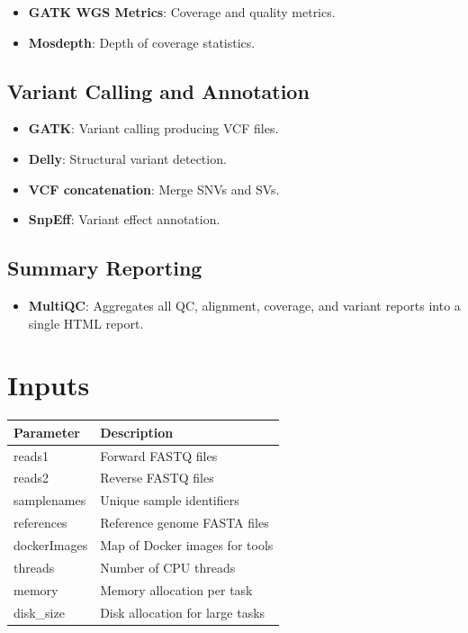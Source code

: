 \documentclass[13pt,letter]{article}
\begin{document}
\begin{itemize}
  \item \textbf{GATK WGS Metrics}: Coverage and quality metrics.
  \item \textbf{Mosdepth}: Depth of coverage statistics.
\end{itemize}

\subsection{Variant Calling and Annotation}

\begin{itemize}
  \item \textbf{GATK}: Variant calling producing VCF files.
  \item \textbf{Delly}: Structural variant detection.
  \item \textbf{VCF concatenation}: Merge SNVs and SVs.
  \item \textbf{SnpEff}: Variant effect annotation.
\end{itemize}

\subsection{Summary Reporting}

\begin{itemize}
  \item \textbf{MultiQC}: Aggregates all QC, alignment, coverage, and variant reports into a single HTML report.
\end{itemize}

\section{Inputs}

\begin{longtable}{ll}
\toprule
\textbf{Parameter} & \textbf{Description} \\
\midrule
reads1 & Forward FASTQ files \\
reads2 & Reverse FASTQ files \\
samplenames & Unique sample identifiers \\
references & Reference genome FASTA files \\
dockerImages & Map of Docker images for tools \\
threads & Number of CPU threads \\
memory & Memory allocation per task \\
disk\_size & Disk allocation for large tasks \\
\bottomrule
\end{longtable}
\end{document}
